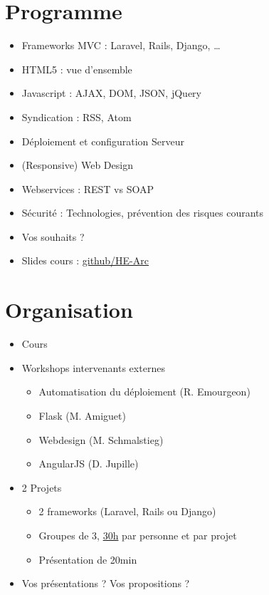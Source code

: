 \hypertarget{programme}{%
\section{Programme}\label{programme}}

\begin{itemize}
\tightlist
\item
  Frameworks MVC : Laravel, Rails, Django, \ldots{}
\item
  HTML5 : vue d'ensemble
\item
  Javascript : AJAX, DOM, JSON, jQuery
\item
  Syndication : RSS, Atom
\item
  Déploiement et configuration Serveur
\item
  (Responsive) Web Design
\item
  Webservices : REST vs SOAP
\item
  Sécurité : Technologies, prévention des risques courants
\item
  {Vos souhaits ?}
\item
  Slides cours :
  \href{https://github.com/HE-Arc/slides-devweb/tree/master/src}{github/HE-Arc}
\end{itemize}

\hypertarget{organisation}{%
\section{Organisation}\label{organisation}}

\begin{itemize}
\tightlist
\item
  Cours
\item
  Workshops intervenants externes

  \begin{itemize}
  \tightlist
  \item
    Automatisation du déploiement (R. Emourgeon)
  \item
    Flask (M. Amiguet)
  \item
    Webdesign (M. Schmalstieg)
  \item
    AngularJS (D. Jupille)
  \end{itemize}
\item
  2 Projets

  \begin{itemize}
  \tightlist
  \item
    2 frameworks (Laravel, Rails ou Django)
  \item
    Groupes de 3,
    \href{https://www.he-arc.ch/sites/www.he-arc.ch/files/Reglements/04\%20Formation\%20de\%20base/43\%20Ing\%C3\%A9nierie/430.100\%20Descriptifs\%20de\%20modules\%20Informatique/RS430.100.17.3255\%20Technologies\%20d'interaction.pdf}{30h}
    par personne et par projet
  \item
    Présentation de 20min
  \end{itemize}
\item
  Vos présentations ? {Vos propositions ?}
\end{itemize}

